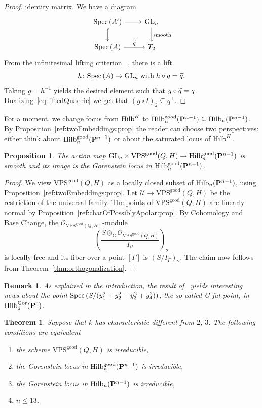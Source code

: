 \documentclass{amsart}
\newcommand{\Hilb}{{\rm{Hilb}}}
\newcommand{\Spec}{{\rm{Spec}}\,}
\newcommand{\PP}{{\bf P}}
\newcommand{\CC}{{\mathbb C}}
\newcommand{\OO}{{\mathcal{O}}}
\newcommand{\Hvanilla}{\Hilb_{n}(\PP^{n-1})}
\newcommand{\Hgood}{\Hilb^{\rm{good}}_{n}(\PP^{n-1})}
\newcommand{\VPSgood}{{\mathrm{VPS}}^{\mathrm{good}}(Q, H)}
\newcommand{\GL}{\mathrm{GL}}%
\newtheorem{proposition}[lemma]{\bf Proposition}
\newtheorem{theorem}[lemma]{\bf Theorem}
\newtheorem{remark}[lemma]{\bf Remark}
\begin{document}
\begin{proof}
    identity matrix. We have a diagram
    \[
        \begin{tikzcd}
            \Spec(A') \ar[d, hook]\ar[r] & \GL_n\ar[d, "\mathrm{smooth}"]\\
            \Spec(A) \ar[r, "\qtilde"] & T_2
        \end{tikzcd}
    \]
    From the infinitesimal lifting criterion~
\cite[{\href{https://stacks.math.columbia.edu/tag/02H6}{Tag 02H6}}]{stacks-project}, there is a lift $$h\colon
    \Spec(A)\to \GL_n \;{\rm with}\; h\circ q = \qtilde.$$ Taking $g = h^{-1}$ yields
    the desired element such that $g\circ \widetilde{q} = q$.
    Dualizing~\eqref{eq:liftedQuadric} we get that $(g\circ I)_2 \subseteq
    q^\perp$.
\end{proof}

For a moment, we change focus from $\Hilb^H$ to $\Hgood\subseteq \Hvanilla$. By
Proposition~\ref{ref:twoEmbeddings:prop} the reader can choose two
perspectives: either think about $\Hgood$ or about the saturated locus of
$\Hilb^H$.
\begin{proposition}\label{smoothMap}
    The action map $\GL_{n} \times \VPSgood\to \Hgood$ is smooth and its
    image is the Gorenstein locus in $\Hgood$.
\end{proposition}

\begin{proof}
    We view $\VPSgood$ as a locally closed subset of $\Hvanilla$, using
    Proposition~\ref{ref:twoEmbeddings:prop}.
    Let $\mathcal{U}\to\VPSgood$ be the restriction of the universal
    family. The points of $\VPSgood$ are linearly normal
    by Proposition~\ref{ref:charOfPossiblyApolar:prop}.
    By Cohomology and Base Change, the $\OO_{\VPSgood}$-module
    \[
        \left(\frac{S\otimes_{\CC}
        \OO_{\VPSgood}}{I_{\mathcal{U}}}\right)_2
    \]
    is locally free and its fiber over a point $[\Gamma]$ is $(S/I_{\Gamma})_2$.
    The claim now follows from Theorem~\ref{thm:orthogonalization}.
\end{proof}

\begin{remark}
    As explained in the introduction,
    the result of~\cite[Corollary~5.16]{RS} yields interesting news about the
    point $\Spec(S/(y_1^2 + y_2^2 + y_3^2 + y_4^2))$, the so-called G-fat
    point, in $\Hilb_{6}^{\mathrm{Gor}}(\PP^{5})$.
\end{remark}
\begin{theorem}\label{ref:reducibility:thm}
    Suppose that $k$ has characteristic different from $2$, $3$. The following conditions are equivalent
    \begin{enumerate}
        \item\label{it:Irrone} the scheme $\VPSgood$ is irreducible,
        \item\label{it:Irrtwo} the Gorenstein locus in $\Hgood$ is irreducible,
        \item\label{it:Irrthree} the Gorenstein locus in $\Hvanilla$ is irreducible,
        \item\label{it:Irrfour} $n\leq 13$.
    \end{enumerate}
\end{theorem}
\end{document}
